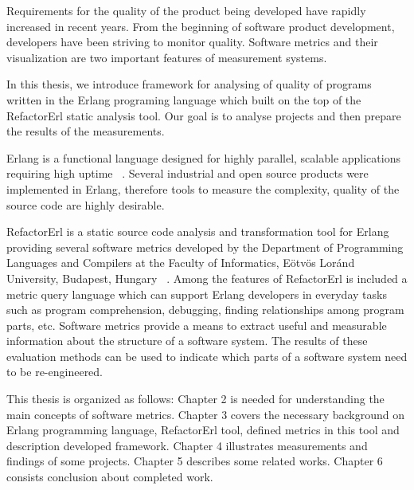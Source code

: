 Requirements for the quality of the product being developed have rapidly increased in recent years. From the beginning of software product development, developers have been striving to monitor quality. Software metrics and their visualization are two important features of measurement systems. 

In this thesis, we introduce framework for analysing of quality of programs written in the Erlang programing language which built on the top of the RefactorErl static analysis tool. Our goal is to analyse
projects and then prepare the results of the measurements.

Erlang is a functional language designed for highly parallel, scalable applications requiring high uptime ~\cite{erlang_o'reilly}. Several industrial and open source products were implemented in Erlang, therefore tools to measure the complexity, quality of the source code are highly desirable. 

RefactorErl is a static source code analysis and transformation tool for Erlang providing several software metrics developed by the Department of Programming Languages and Compilers at the Faculty of Informatics, Eötvös Loránd University, Budapest, Hungary ~\cite{refactorerl2}. 
Among the features of RefactorErl is included a metric query language which can support Erlang developers in everyday tasks such as program comprehension, debugging, finding relationships among program parts, etc.
Software metrics provide a means to extract useful and measurable information about the structure of a software system. The results of these evaluation methods can be used to indicate which parts of a software system need to be re-engineered.

This thesis is organized as follows: Chapter 2 is needed for understanding the main concepts of software metrics. Chapter 3 covers the necessary background on Erlang programming language, RefactorErl tool, defined metrics  in this tool and description developed framework. Chapter 4 illustrates measurements and findings of some projects. Chapter 5 describes some related works. Chapter 6 consists conclusion about completed work.

